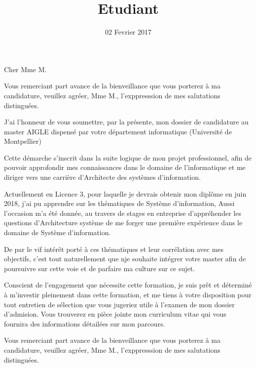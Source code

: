 \documentclass[11pt,a4paper,sans]{moderncv}        %
\title{Etudiant}                               %
\begin{document}
\date{02 Fevrier 2017}
\opening{Cher Mme M.}
\closing{Vous remerciant part avance de la bienveillance que vous porterez à ma candidature, veuillez agréer, Mme M., l'exppresssion de mes salutations distinguées.}
\makelettertitle

J'ai l'honneur de vous soumettre, par la présente, mon dossier de candidature au master AIGLE dispensé par votre département informatique (Université de Montpellier)

Cette démarche s'inscrit dans la suite logique de mon projet professionnel, afin de pouvoir approfondir mes connaissances dans le domaine de l'informatique et me diriger vers une carrière d'Architecte des systèmes d'information.

Actuellement en Licence 3, pour laquelle je devrais obtenir mon diplôme en juin 2018, j'ai pu apprendre sur les thématiques de Système d'information, Aussi l'occasion m'a été donnée, au travers de stages en entreprise d'appréhender les questions d'Architecture système de me forger une première expérience dans le domaine de Système d'information.

De par le vif intérêt porté à ces thématiques et leur corrélation avec mes objectifs, c'est tout naturellement que nje souhaite intégrer votre master afin de poursuivre sur cette voie et de parfaire ma culture sur ce sujet.

Conscient de l'engagement que nécessite cette formation, je suis prêt et déterminé à m'investir pleinement dans cette formation, et me tiens à votre disposition pour tout entretien de sélection que vous jugeriez utile à l'examen de mon dossier d'admision. Vous trouverez en pièce jointe mon curriculum vitae qui vous fournira des informations détailées sur mon parcours.

Vous remerciant part avance de la bienveillance que vous porterez à ma candidature, veuillez agréer, Mme M., l'exppresssion de mes salutations distinguées.




\makeletterclosing
\end{document}
